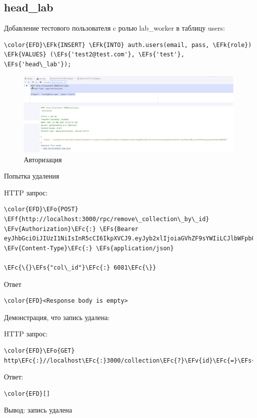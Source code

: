 \documentclass[14pt]{extarticle}
\newcommand{\EFc}[1]{\textcolor{EFc}{#1}} %
\newcommand{\EFs}[1]{\textcolor{EFs}{#1}} %
\newcommand{\EFk}[1]{\textcolor{EFk}{#1}} %
\newcommand{\EFf}[1]{\textcolor{EFf}{#1}} %
\newcommand{\EFv}[1]{\textcolor{EFv}{#1}} %
\newcommand{\EFo}[1]{\textcolor{EFo}{#1}} %
\begin{document}
\subsection{head\_​lab}
\label{sec:org8559e1c}


Добавление тестового пользователя c ролью lab\_​worker в таблицу users:
\begin{Code}
\begin{Verbatim}
\color{EFD}\EFk{INSERT} \EFk{INTO} auth.users(email, pass, \EFk{role}) \EFk{VALUES} (\EFs{'test2@test.com'}, \EFs{'test'}, \EFs{'head\_lab'});
\end{Verbatim}
\end{Code}


\begin{figure}[H]
\centering
\includegraphics[width=.9\linewidth]{images/2023-05-01_18-24-03_screenshot.png}
\caption{Авторизация}
\end{figure}


Попытка удаления

HTTP запрос:
\begin{Code}
\begin{Verbatim}
\color{EFD}\EFo{POST} \EFf{http://localhost:3000/rpc/remove\_collection\_by\_id}
\EFv{Authorization}\EFc{:} \EFs{Bearer eyJhbGciOiJIUzI1NiIsInR5cCI6IkpXVCJ9.eyJyb2xlIjoiaGVhZF9sYWIiLCJlbWFpbCI6InRlc3QyQHRlc3QuY29tIiwiZXhwIjoxNjgyOTU4MjA3fQ.mkzS0XwjVWW\_yook7JUPx3UyypScqrWh9mkKCmWWAN0}
\EFv{Content-Type}\EFc{:} \EFs{application/json}

\EFc{\{}\EFs{"col\_id"}\EFc{:} 6081\EFc{\}}
\end{Verbatim}
\end{Code}

Ответ
\begin{Code}
\begin{Verbatim}
\color{EFD}<Response body is empty>
\end{Verbatim}
\end{Code}

Демонстрация, что запись удалена:

HTTP запрос:
\begin{Code}
\begin{Verbatim}
\color{EFD}\EFo{GET} http\EFc{:}//localhost\EFc{:}3000/collection\EFc{?}\EFv{id}\EFc{=}\EFs{eq.6081}
\end{Verbatim}
\end{Code}

Ответ:
\begin{Code}
\begin{Verbatim}
\color{EFD}[]
\end{Verbatim}
\end{Code}

Вывод: запись удалена
\end{document}
